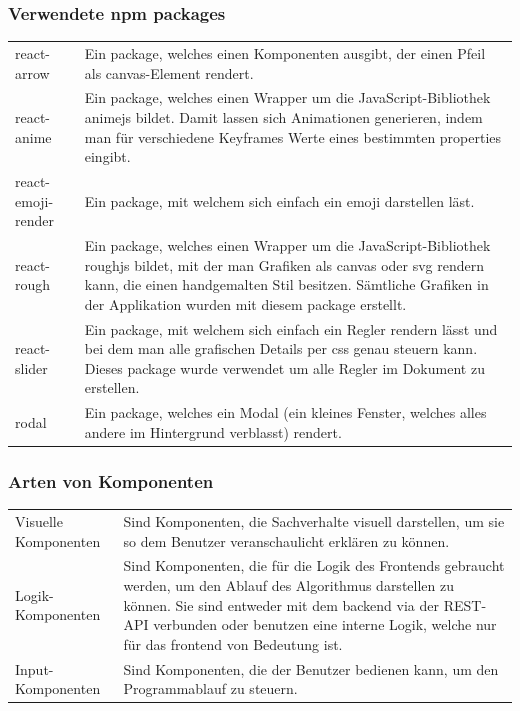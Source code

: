 \documentclass[a4paper,10.2pt,pdftex]{scrartcl}%
\begin{document}
\subsubsection{Verwendete npm packages}
\begin{tabularx}{\textwidth}{p{3cm}p{11cm}}
react-arrow &  Ein package, welches einen Komponenten ausgibt, der einen Pfeil als canvas-Element rendert. \\
react-anime &  Ein package, welches einen Wrapper um die JavaScript-Bibliothek animejs bildet. Damit lassen sich Animationen generieren, indem man für verschiedene Keyframes Werte eines bestimmten properties eingibt. \\
react-emoji-render &  Ein package, mit welchem sich einfach ein emoji darstellen läst. \\
react-rough &  Ein package, welches einen Wrapper um die JavaScript-Bibliothek roughjs bildet, mit der man Grafiken als canvas oder svg rendern kann, die einen handgemalten Stil besitzen. Sämtliche Grafiken in der Applikation wurden mit diesem package erstellt. \\
react-slider&  Ein package, mit welchem sich einfach ein Regler rendern lässt und bei dem man alle grafischen  Details per css genau steuern kann. Dieses package wurde verwendet um alle Regler im Dokument zu erstellen. \\
rodal&  Ein package, welches ein Modal (ein kleines Fenster, welches alles andere im Hintergrund verblasst)  rendert.

\end{tabularx}

\subsubsection{Arten von Komponenten}
\begin{tabularx}{\textwidth}{p{3cm}p{11cm}} 
Visuelle Komponenten &  Sind Komponenten, die Sachverhalte visuell darstellen, um sie so dem Benutzer veranschaulicht erklären zu können. \\
Logik-Komponenten & Sind Komponenten, die für die Logik des Frontends gebraucht werden, um den Ablauf des Algorithmus darstellen zu können. Sie sind entweder mit dem backend via der REST-API verbunden oder benutzen eine interne Logik, welche nur für das frontend von Bedeutung ist. \\
Input-Komponenten & Sind Komponenten, die der Benutzer bedienen kann, um den Programmablauf zu steuern.
\end{tabularx}
\end{document}
